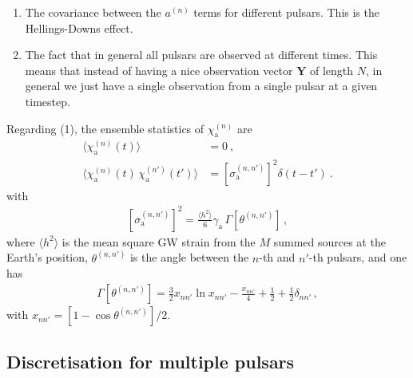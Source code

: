 \documentclass[]{scrartcl}
\begin{document}
\begin{enumerate}
	\item The covariance between the $a^{(n)}$ terms for different pulsars. This is the Hellings-Downs effect.
	\item The fact that in general all pulsars are observed at different times. This means that instead of having a nice observation vector $\mathbf{Y}$ of length $N$, in general we just have a single observation from a single pulsar at a given timestep. 
\end{enumerate}


\noindent Regarding (1), the ensemble statistics of $\chi_{\mathrm a}^{(n)}$ are
\begin{align}
	\langle \chi^{(n)}_{\mathrm a}(t) \rangle &= 0 \ , 	\label{eq:xieqn1} \\
	\langle \chi^{(n)}_{\mathrm a}(t) \, \chi^{(n')}_{\mathrm a}(t') \rangle &= \left[\sigma^{(n,n')}_{\mathrm a}\right]^2 \delta(t - t') \ .	\label{eq:xieqn2}
\end{align}
with
\begin{eqnarray}
	\left[\sigma^{(n,n')}_{\mathrm a}\right]^2 = \frac{\langle h^2\rangle}{6} \gamma_{\mathrm a} \, \Gamma \left[ \theta^{(n,n')} \right] \, , \label{eq:sigma_a_expression}
\end{eqnarray}
where $\langle h^2 \rangle$ is the mean square GW strain from the $M$ summed sources at the Earth's position, $\theta^{(n,n')}$ is the angle between the $n$-th and $n'$-th pulsars, and one has
\begin{eqnarray}
	\Gamma\left[\theta^{(n,n')} \right] =  \frac{3}{2} x_{n n'} \ln x_{n n'}  -\frac{x_{n n'} }{4}+\frac{1}{2} + \frac{1}{2} \delta_{n n'}\label{eq:correlation} \, ,
\end{eqnarray}
with $x_{nn'} = \left[1 - \cos \theta^{(n,n')}\right]/2$. 



\subsection{Discretisation for multiple pulsars}
	
\end{document}
